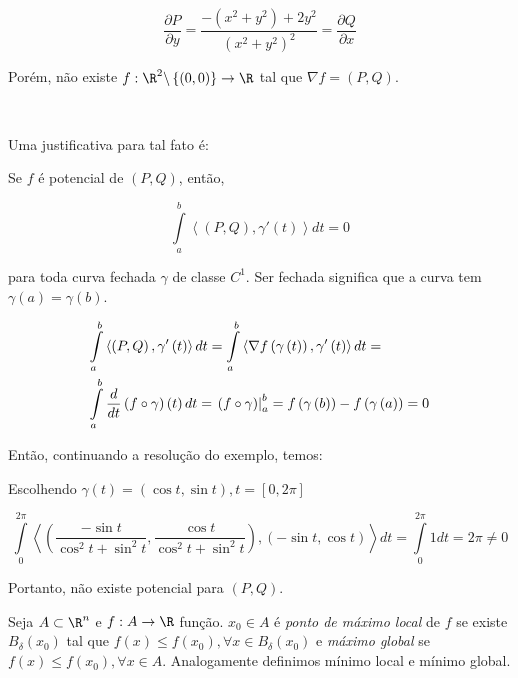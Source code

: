 \documentclass{book}
\begin{document}
\begin{sol}
\[
\frac{{\partial P}}
{{\partial y}} = \frac{{ - \left( {x^2  + y^2 } \right) + 2y^2 }}
{{\left( {x^2  + y^2 } \right)^2 }} = \frac{{\partial Q}}
{{\partial x}}
\]

    Por\'em, n\~ao existe $f:\R^2 \backslash \left\{ {\left( {0,0} \right)} \right\} \to \R$ tal que $\nabla f = \left( {P,Q} \right)$.

\

Uma justificativa para tal fato \'e:

Se $f$ \'e potencial de $(P,Q)$, ent\~ao,

\[
    \int\limits_a^b {\left\langle {\left( {P,Q} \right),\gamma '\left( t \right)} \right\rangle dt}  = 0
\]

    para toda curva fechada $\gamma$ de classe $C^1$. Ser fechada significa que a curva tem $\gamma \left( a \right) = \gamma \left( b \right)$.

\[
\begin{gathered}
  \int\limits_a^b {\left\langle {\left( {P,Q} \right),\gamma '\left( t \right)} \right\rangle dt}  = \int\limits_a^b {\left\langle {\nabla f\left( {\gamma \left( t \right)} \right),\gamma '\left( t \right)} \right\rangle dt}  =  \hfill \\
\int\limits_a^b {\frac{d}
{{dt}}\left( {f \circ \gamma } \right)\left( t \right)dt}  = \left. {\left( {f \circ \gamma } \right)} \right|_a^b  = f\left( {\gamma \left( b \right)} \right) - f\left( {\gamma \left( a \right)} \right) = 0 \hfill \\
\end{gathered}
\]

Ent\~ao, continuando a resolu\c c\~ao do exemplo, temos:

    Escolhendo $\gamma \left( t \right) = \left( {\cos t,\sin t} \right),t = \left[ {0,2\pi } \right]$

\[
\int\limits_0^{2\pi } {\left\langle {\left( {\frac{{ - \sin t}}
{{\cos ^2 t + \sin ^2 t}},\frac{{\cos t}}
{{\cos ^2 t + \sin ^2 t}}} \right),\left( { - \sin t,\cos t} \right)} \right\rangle dt}  = \int\limits_0^{2\pi } {1dt}  = 2\pi  \ne 0
\]

Portanto, n\~ao existe potencial para $(P,Q)$.

\end{sol}

\begin{defn} 
  \begin{sloppypar}
    Seja $A \subset \R^n$ e $f:A \to \R$ fun\c c\~ao. $x_0 \in A$ \'e \textit{ponto de m\'aximo local} de $f$ se existe $B_\delta  \left( {x_0 } \right)$ tal que ${f\left( x \right) \leqslant f\left( {x_0 } \right),\forall x \in B_\delta  \left( {x_0 } \right)}$ e \textit{m\'aximo global} se $f\left( x \right) \leqslant f\left( {x_0 } \right),\forall x \in A$. Analogamente definimos m\'inimo local e m\'inimo global.
  \end{sloppypar}
\end{defn}
\end{document}

